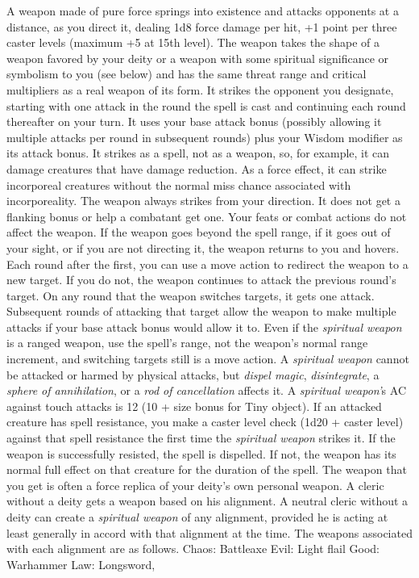A weapon made of pure force springs into existence and attacks opponents at a distance,
as you direct it, dealing 1d8 force damage per hit, +1 point per three caster levels
(maximum +5 at 15th level). The weapon takes the shape of a weapon favored by your
deity or a weapon with some spiritual significance or symbolism to you (see below)
and has the same threat range and critical multipliers as a real weapon of its
form. It strikes the opponent you designate, starting with one attack in the round
the spell is cast and continuing each round thereafter on your turn. It uses your
base attack bonus (possibly allowing it multiple attacks per round in subsequent
rounds) plus your Wisdom modifier as its attack bonus. It strikes as a spell, not
as a weapon, so, for example, it can damage creatures that have damage reduction.
As a force effect, it can strike incorporeal creatures without the normal miss
chance associated with incorporeality. The weapon always strikes from your direction.
It does not get a flanking bonus or help a combatant get one. Your feats or combat
actions do not affect the weapon. If the weapon goes beyond the spell range, if
it goes out of your sight, or if you are not directing it, the weapon returns to
you and hovers.
Each round after the first, you can use a move action to redirect the weapon to
a new target. If you do not, the weapon continues to attack the previous round's
target. On any round that the weapon switches targets, it gets one attack. Subsequent
rounds of attacking that target allow the weapon to make multiple attacks if your
base attack bonus would allow it to. Even if the \textit{spiritual weapon} is a
ranged weapon, use the spell's range, not the weapon's normal range increment,
and switching targets still is a move action.
A \textit{spiritual weapon} cannot be attacked or harmed by physical attacks, but
\textit{dispel magic}, \textit{disintegrate}, a \textit{sphere of annihilation},
or a \textit{rod of cancellation} affects it. A \textit{spiritual weapon'}s AC
against touch attacks is 12 (10 + size bonus for Tiny object).
If an attacked creature has spell resistance, you make a caster level check (1d20
+ caster level) against that spell resistance the first time the \textit{spiritual
weapon} strikes it. If the weapon is successfully resisted, the spell is dispelled.
If not, the weapon has its normal full effect on that creature for the duration
of the spell.
The weapon that you get is often a force replica of your deity's own personal weapon.
A cleric without a deity gets a weapon based on his alignment. A neutral cleric
without a deity can create a \textit{spiritual weapon} of any alignment, provided
he is acting at least generally in accord with that alignment at the time. The
weapons associated with each alignment are as follows.
Chaos: Battleaxe
Evil: Light flail
Good: Warhammer
Law: Longsword,